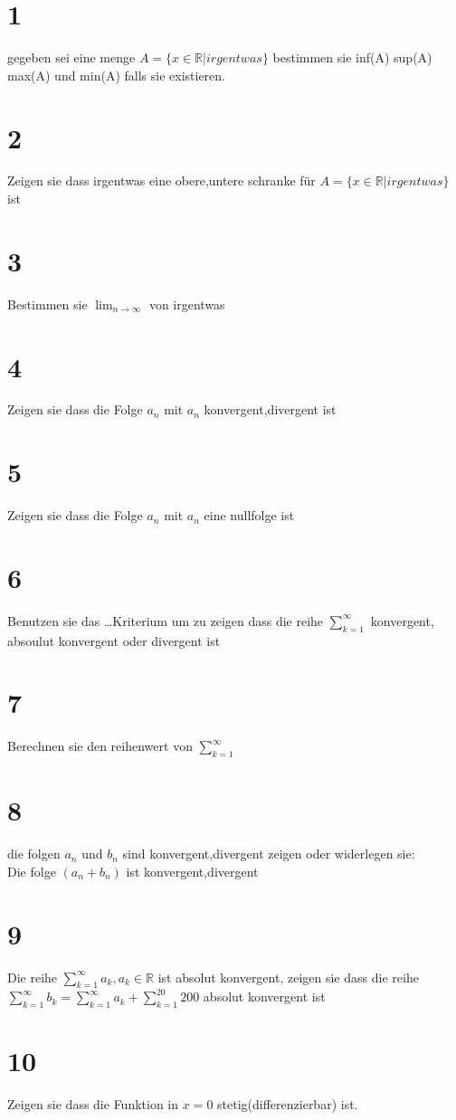 \documentclass[11pt,oneside,a4paper]{scrartcl}
\begin{document}
\section*{1}
gegeben sei eine menge $A=\{x\in\mathbb{R}| irgentwas\}$ bestimmen sie inf(A) sup(A) max(A) und min(A) falls sie existieren.
\section*{2}
Zeigen sie dass irgentwas eine obere,untere schranke f\"ur $A=\{x\in\mathbb{R}| irgentwas\}$ ist\\
\section*{3}
Bestimmen sie $\lim_{n\to\infty}$ von irgentwas%
\section*{4}
Zeigen sie dass die Folge $a_n$ mit $a_n$ konvergent,divergent ist
\section*{5}
Zeigen sie dass die Folge $a_n$ mit $a_n$ eine nullfolge ist
\section*{6}
Benutzen sie das \dots Kriterium um zu zeigen dass die reihe $\sum^{\infty}_{k=1}$ konvergent, absoulut konvergent oder divergent ist 
\section*{7}
Berechnen sie den reihenwert von  $\sum^{\infty}_{k=1}$
\section*{8}
die folgen $a_n$ und $b_n$ sind konvergent,divergent zeigen oder widerlegen sie:\\
Die folge $(a_n+b_n)$ ist konvergent,divergent
\section*{9}
Die reihe $\sum^{\infty}_{k=1}a_k,a_k\in\mathbb{R}$ ist absolut konvergent, zeigen sie dass die reihe $\sum^{\infty}_{k=1}b_k=\sum^{\infty}_{k=1}a_k+\sum^{20}_{k=1}200$ absolut konvergent ist
\section*{10}
Zeigen sie dass die Funktion in $x=0$ stetig(differenzierbar) ist.
\end{document}
